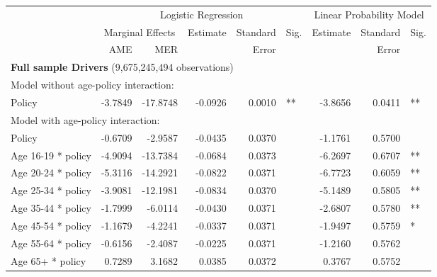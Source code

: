 
\begin{table}%
\centering 
\begin{tabular}{l r r r r l r r l} 

\hline 
 
 & \multicolumn{5}{c}{Logistic Regression}  & \multicolumn{3}{c}{Linear Probability Model} \\ 

 \cmidrule(lr){2-6}\cmidrule(lr){7-9} 
 & \multicolumn{2}{c}{Marginal Effects} & Estimate & Standard & Sig. & Estimate & Standard & Sig. \\ 

 \cmidrule(lr){2-3} 
 &   AME &  MER  &          &  Error   &      &          &  Error   &     \\ 

\hline 
 
\multicolumn{8}{l}{\textbf{Full sample Drivers} (9,675,245,494 observations)} \\ 

\hline
\multicolumn{8}{l}{Model without age-policy interaction: } \\ 
Policy                   &  -3.7849        &  -17.8748       &  -0.0926        &  0.0010       &   **       &  -3.8656        &  0.0411       &   **       \\ 
\hline
\multicolumn{8}{l}{Model with age-policy interaction: } \\ 
Policy                   &  -0.6709        &  -2.9587       &  -0.0435        &  0.0370       &            &  -1.1761        &  0.5700       &            \\ 
Age 16-19 * policy   &  -4.9094        &  -13.7384       &  -0.0684        &  0.0373       &            &  -6.2697        &  0.6707       &   **       \\ 
Age 20-24 * policy   &  -5.3116        &  -14.2921       &  -0.0822        &  0.0371       &            &  -6.7723        &  0.6059       &   **       \\ 
Age 25-34 * policy   &  -3.9081        &  -12.1981       &  -0.0834        &  0.0370       &            &  -5.1489        &  0.5805       &   **       \\ 
Age 35-44 * policy   &  -1.7999        &  -6.0114       &  -0.0430        &  0.0371       &            &  -2.6807        &  0.5780       &   **       \\ 
Age 45-54 * policy   &  -1.1679        &  -4.2241       &  -0.0337        &  0.0371       &            &  -1.9497        &  0.5759       &    *       \\ 
Age 55-64 * policy   &  -0.6156        &  -2.4087       &  -0.0225        &  0.0371       &            &  -1.2160        &  0.5762       &            \\ 
Age 65+ * policy   &  0.7289        &  3.1682       &  0.0385        &  0.0372       &            &  0.3767        &  0.5752       &            \\ 


\end{tabular}
\end{table}
